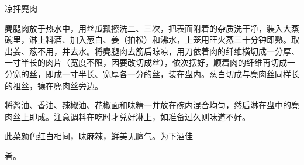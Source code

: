 \begin{recipe}{凉拌麂肉}

\ingredients


\cooking

\step 麂腿肉放于热水中，用丝瓜瓤擦洗二、三次，把表面附着的杂质洗干净，装入大蒸碗里，淋上料酒、加入葱白、姜（拍松）和沸水，上笼用旺火蒸三十分钟即熟。取出姜、葱不用，并去水。将麂腿肉去筋后晾凉，用刀依着肉的纤维横切成一分厚、一寸半长的肉片（宽度不限，因要改切成丝），依次摆好，顺着肉的纤维再切成一分宽的丝，即成一寸半长、宽厚各一分的丝，装在盘内。葱白切成与麂肉丝同样长的祖丝，镶在麂肉丝旁边。

\step 将酱油、香油、辣椒油、花椒面和味精一并放在碗内混合均匀，然后淋在盘中的麂肉丝上即成。注意调料在吃时才兑好淋上，如准备过久则味道不好。

\notes

此菜颜色红白相间，昧麻辣，鲜美无膻气。为下酒佳

肴。

\end{recipe}

